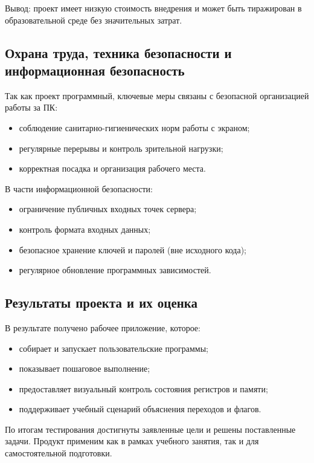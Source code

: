 \documentclass[12pt,a4paper]{article}
\begin{document}
Вывод: проект имеет низкую стоимость внедрения и может быть тиражирован в образовательной среде без значительных затрат.

\subsection{Охрана труда, техника безопасности и информационная безопасность}
Так как проект программный, ключевые меры связаны с безопасной организацией работы за ПК:
\begin{itemize}
  \item соблюдение санитарно-гигиенических норм работы с экраном;
  \item регулярные перерывы и контроль зрительной нагрузки;
  \item корректная посадка и организация рабочего места.
\end{itemize}

В части информационной безопасности:
\begin{itemize}
  \item ограничение публичных входных точек сервера;
  \item контроль формата входных данных;
  \item безопасное хранение ключей и паролей (вне исходного кода);
  \item регулярное обновление программных зависимостей.
\end{itemize}

\subsection{Результаты проекта и их оценка}
В результате получено рабочее приложение, которое:
\begin{itemize}
  \item собирает и запускает пользовательские программы;
  \item показывает пошаговое выполнение;
  \item предоставляет визуальный контроль состояния регистров и памяти;
  \item поддерживает учебный сценарий объяснения переходов и флагов.
\end{itemize}

По итогам тестирования достигнуты заявленные цели и решены поставленные задачи. Продукт применим как в рамках учебного занятия, так и для самостоятельной подготовки.
\end{document}
